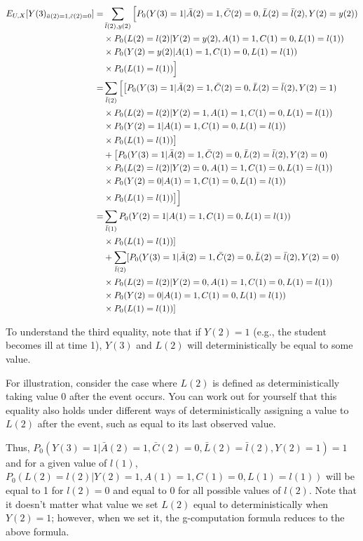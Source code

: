 \documentclass{exam}
\begin{document}
\begin{solution}
\begin{enumerate}
\begin{align*}
E_{U,X}[Y(3)_{\bar{a}(2)=1, \bar{c}(2)=0}] = & \sum_{\bar{l}(2), y(2)} \Big{[}P_0(Y(3) = 1 | \bar{A}(2) = 1, \bar{C}(2) = 0, \bar{L}(2) = \bar{l}(2), Y(2) = y(2)) \\
& \times P_0(L(2) = l(2) | Y(2) = y(2), A(1) = 1, C(1) = 0, L(1) = l(1)) \\
& \times P_0(Y(2) = y(2) | A(1) = 1, C(1) = 0, L(1) = l(1)) \\
& \times P_0(L(1) = l(1)) \Big{]}\\
= & \sum_{\bar{l}(2)} \Big{[}\big{[}P_0(Y(3) = 1 | \bar{A}(2) = 1, \bar{C}(2) = 0, \bar{L}(2) = \bar{l}(2), Y(2) = 1) \\
& \times P_0(L(2) = l(2) | Y(2) = 1, A(1) = 1, C(1) = 0, L(1) = l(1)) \\
& \times P_0(Y(2) = 1 | A(1) = 1, C(1) = 0, L(1) = l(1)) \\
& \times P_0(L(1) = l(1))\big{]} \\
& + \big{[}P_0(Y(3) = 1 | \bar{A}(2) = 1, \bar{C}(2) = 0, \bar{L}(2) = \bar{l}(2), Y(2) = 0) \\
& \times P_0(L(2) = l(2) | Y(2) = 0, A(1) = 1, C(1) = 0, L(1) = l(1)) \\
& \times P_0(Y(2) = 0 | A(1) = 1, C(1) = 0, L(1) = l(1)) \\
& \times P_0(L(1) = l(1))\big{]}\Big{]} \\
= & \sum_{\bar{l}(1)} P_0(Y(2) = 1 | A(1) = 1, C(1) = 0, L(1) = l(1)) \\
& \times P_0(L(1) = l(1)) ]\\
& + \sum_{\bar{l}(2)} [P_0(Y(3) = 1 | \bar{A}(2) = 1, \bar{C}(2) = 0, \bar{L}(2) = \bar{l}(2), Y(2) = 0) \\
& \times P_0(L(2) = l(2) | Y(2) = 0, A(1) = 1, C(1) = 0, L(1) = l(1)) \\
& \times P_0(Y(2) = 0 | A(1) = 1, C(1) = 0, L(1) = l(1)) \\
& \times P_0(L(1) = l(1))]
\end{align*}

To understand the third equality, note that if $Y(2) = 1$ (e.g., the student becomes ill at time 1), $Y(3)$ and $L(2)$ will deterministically be equal to some value.

For illustration, consider the case where $L(2)$ is defined as deterministically taking value 0 after the event occurs. You can work out for yourself that this equality also holds under different ways of deterministically assigning a value to $L(2)$ after the event, such as equal to its last observed value. 

Thus, $P_0(Y(3) = 1 | \bar{A}(2) = 1, \bar{C}(2) = 0, \bar{L}(2) = \bar{l}(2), Y(2) = 1) = 1$ and for a given value of $l(1)$, $P_0(L(2) = l(2) | Y(2) = 1, A(1) = 1, C(1) = 0, L(1) = l(1))$ will be equal to 1 for $l(2) = 0$ and equal to 0 for all possible values of $l(2)$. Note that it doesn't matter what value we set $L(2)$ equal to deterministically when $Y(2) = 1$; however, when we set it, the g-computation formula reduces to the above formula. 

\end{enumerate}
\end{solution}
\end{document}
